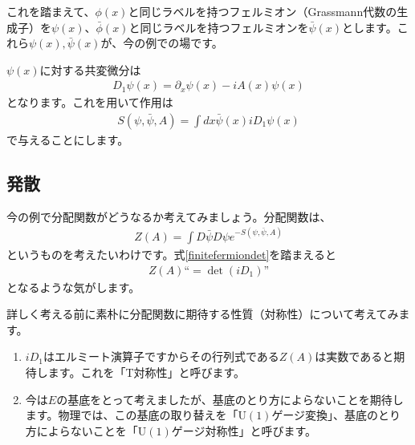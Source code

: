 \documentclass[paper=a4, fontsize=12pt, line_length=16cm, number_of_lines=33,dvipdfmx]{jlreq}
\numberwithin{equation}{section}
\newcommand{\del}{\partial}
\newcommand{\psib}{\bar{\psi}}
\newcommand{\phib}{\bar{\phi}}
\newcommand{\U}{\mathrm{U}}
\begin{document}
これを踏まえて、$\phi(x)$と同じラベルを持つフェルミオン（Grassmann代数の生成子）を$\psi(x)$、$\phib(x)$と同じラベルを持つフェルミオンを$\psib(x)$とします。これら$\psi(x),\psib(x)$が、今の例での場です。

$\psi(x)$に対する共変微分は
\begin{align}
  D_1\psi(x)=\del_{x}\psi(x)-iA(x)\psi(x)
\end{align}
となります。これを用いて作用は
\begin{align}
  S(\psi,\psib,A)=\int dx \psib(x)iD_1 \psi(x)\label{1daction}
\end{align}
で与えることにします。


\subsection{発散}
今の例で分配関数がどうなるか考えてみましょう。分配関数は、
\begin{align}
  Z(A)=\int D\psib D\psi e^{-S(\psi,\psib,A)}
\end{align}
というものを考えたいわけです。式\eqref{finitefermiondet}を踏まえると
\begin{align}
  Z(A)\text{``}=\det(iD_1)\text{''}
\end{align}
となるような気がします。

詳しく考える前に素朴に分配関数に期待する性質（対称性）について考えてみます。
\begin{enumerate}
  \item $iD_1$はエルミート演算子ですからその行列式である$Z(A)$は実数であると期待します。これを「T対称性」と呼びます。
  \item 今は$E$の基底をとって考えましたが、基底のとり方によらないことを期待します。物理では、この基底の取り替えを「$\U(1)$ゲージ変換」、基底のとり方によらないことを「$\U(1)$ゲージ対称性」と呼びます。
\end{enumerate}
\end{document}
